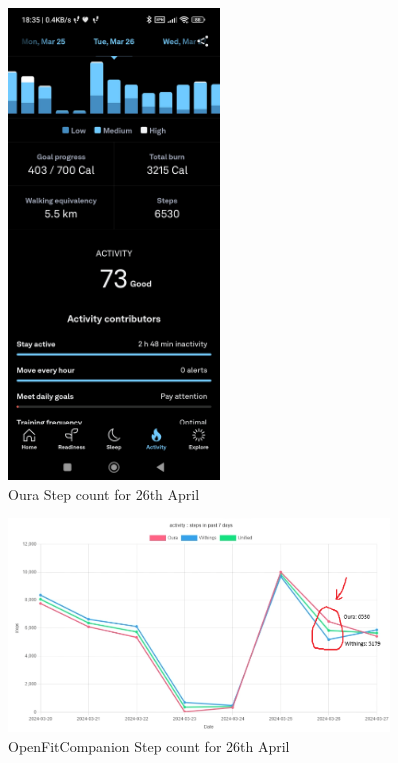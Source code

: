 \begin{figure}
    
    \centering
    \includegraphics[width=0.5\textwidth,keepaspectratio]{../images/OuraActivity.jpg}
    \caption{Oura Step count for 26th April}
    \label{fig:ouraSteps}
    
\end{figure}
\begin{figure}
    
    \centering
    \includegraphics[width=0.9\textwidth,keepaspectratio]{../images/dashboard.png}
    \caption{OpenFitCompanion Step count for 26th April}
    \label{fig:openFitCompanionSteps}
    
\end{figure}
